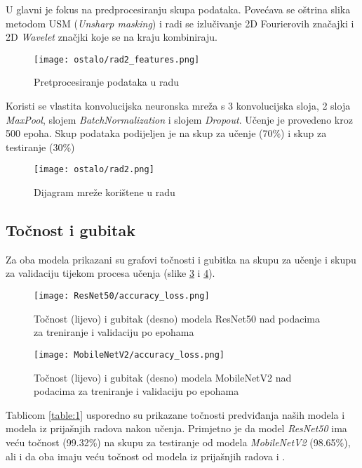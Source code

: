 \documentclass[conference, utf8]{IEEEtran}
\begin{document}
	U \cite{RAD2} glavni je fokus na predprocesiranju skupa podataka. Povećava se oštrina slika metodom USM (\textit{Unsharp masking}) i radi se izlučivanje 2D Fourierovih značajki i 2D \textit{Wavelet} značjki koje se na kraju kombiniraju.
	
	\begin{figure}[H]
		\centering
		\texttt{[image: ostalo/rad2\_features.png]}
		\caption{Pretprocesiranje podataka u radu \cite{RAD2}}
		\label{fig:rad2_features}
	\end{figure}
	
	 Koristi se vlastita konvolucijska neuronska mreža s 3 konvolucijska sloja, 2 sloja \textit{MaxPool}, slojem \textit{BatchNormalization} i slojem \textit{Dropout}. Učenje je provedeno kroz 500 epoha. Skup podataka podijeljen je na skup za učenje (70\%) i skup za testiranje (30\%)
	\begin{figure}[H]
		\centering
		\texttt{[image: ostalo/rad2.png]}
		\caption{Dijagram mreže korištene u radu \cite{RAD2}}
		\label{fig:rad2}
	\end{figure}

	
	
	
	\subsection{Točnost i gubitak}
	Za oba modela prikazani su grafovi točnosti i gubitka na skupu za učenje i skupu za validaciju tijekom procesa učenja (slike \ref{fig:RN50_acc_loss} i \ref{fig:MN_acc_loss}). 
	\begin{figure}[H]
		\centering
		\texttt{[image: ResNet50/accuracy\_loss.png]}
		\caption{Točnost (lijevo) i gubitak (desno) modela ResNet50 nad podacima za treniranje i validaciju po epohama}
		\label{fig:RN50_acc_loss}
	\end{figure}
	\begin{figure}[H]
		\centering
		\texttt{[image: MobileNetV2/accuracy\_loss.png]}
		\caption{Točnost (lijevo) i gubitak (desno) modela MobileNetV2 nad podacima za treniranje i validaciju po epohama}
		\label{fig:MN_acc_loss}
	\end{figure}
	
	Tablicom \ref{table:1} usporedno su prikazane točnosti predviđanja naših modela i modela iz prijašnjih radova nakon učenja. 	
	Primjetno je da model \textit{ResNet50} ima veću točnost (99.32\%) na skupu za testiranje od modela \textit{MobileNetV2} (98.65\%), ali i da oba imaju veću točnost od modela iz prijašnjih radova \cite{RAD1} i \cite{RAD2}.
	
\end{document}
